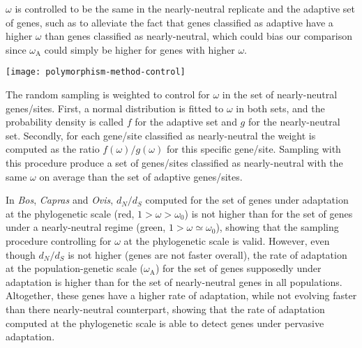 \documentclass{article}
\newcommand{\dn}{d_N}
\newcommand{\ds}{d_S}
\newcommand{\dnds}{\dn / \ds}
\newcommand{\rateApop}{\omega_{\mathrm{A}}}
\begin{document}
    $\omega$ is controlled to be the same in the nearly-neutral replicate and the adaptive set of genes, such as to alleviate the fact that genes classified as adaptive have a higher $\omega$ than genes classified as nearly-neutral, which could bias our comparison since $\rateApop$ could simply be higher for genes with higher $\omega$.

    \begin{center}
        \texttt{[image: polymorphism-method-control]}
    \end{center}

    The random sampling is weighted to control for $\omega$ in the set of nearly-neutral genes/sites.
    First, a normal distribution is fitted to $\omega$ in both sets, and the probability density is called $f$ for the adaptive set and $g$ for the nearly-neutral set.
    Secondly, for each gene/site classified as nearly-neutral the weight is computed as the ratio $f(\omega)/g(\omega)$ for this specific gene/site.
    Sampling with this procedure produce a set of genes/sites classified as nearly-neutral with the same $\omega$ on average than the set of adaptive genes/sites.
    \newpage
    

    In \textit{Bos}, \textit{Capras} and \textit{Ovis}, $\dnds$ computed for the set of genes under adaptation at the phylogenetic scale (red, $1 > \omega > \omega_{0}$) is not higher than for the set of genes under a nearly-neutral regime (green, $1 > \omega \simeq \omega_{0}$), showing that the sampling procedure controlling for $\omega$ at the phylogenetic scale is valid.
    However, even though $\dnds$ is not higher (genes are not faster overall), the rate of adaptation at the population-genetic scale ($\rateApop$) for the set of genes supposedly under adaptation is higher than for the set of nearly-neutral genes in all populations.
    Altogether, these genes have a higher rate of adaptation, while not evolving faster than there nearly-neutral counterpart, showing that the rate of adaptation computed at the phylogenetic scale is able to detect genes under pervasive adaptation.

    \pagebreak

    
\end{document}
